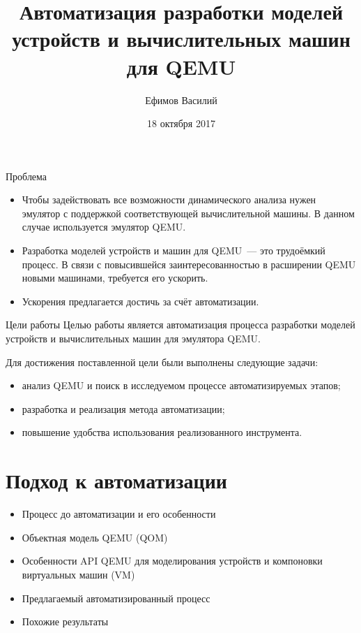 \documentclass[unicode,hyperref={unicode=true}]{beamer}
\title[]
{Автоматизация разработки моделей устройств и вычислительных машин для QEMU}
\author[]{Ефимов Василий}
\institute[]{ИСП РАН}
\date[]{18 октября 2017}
\newcommand*{\sectionpagekb}{\usebeamertemplate*{section page kb}}
\theoremstyle{definition}
\theoremstyle{plain}
\begin{document}
\begin{frame}
\titlepage
\end{frame}



\begin{frame}{Проблема}
\begin{itemize}
\item Чтобы задействовать все возможности динамического анализа нужен эмулятор с
поддержкой соответствующей вычислительной машины.
В данном случае используется эмулятор QEMU.
\vfill
\item Разработка моделей устройств и машин для QEMU~--- это трудоёмкий процесс.
В связи с повысившейся заинтересованностью в расширении QEMU новыми
машинами, требуется его ускорить.
\vfill
\item Ускорения предлагается достичь за счёт автоматизации.
\end{itemize}
\end{frame}



\begin{frame}{Цели работы}
Целью работы является автоматизация процесса разработки моделей устройств и
вычислительных машин для эмулятора QEMU.

\vfill

{Для достижения поставленной цели были выполнены следующие задачи:}

\begin{itemize}
\item анализ QEMU и поиск в исследуемом процессе автоматизируемых этапов;
\item разработка и реализация метода автоматизации;
\item повышение удобства использования реализованного инструмента.
\end{itemize}
\end{frame}



\section{Подход к автоматизации}
\begin{frame}
\sectionpagekb
\begin{itemize}
\item Процесс до автоматизации и его особенности
\item Объектная модель QEMU (QOM)
\item Особенности API QEMU для моделирования устройств и компоновки виртуальных
машин (VM)
\item Предлагаемый автоматизированный процесс
\item Похожие результаты
\end{itemize}
\end{frame}
\end{document}
